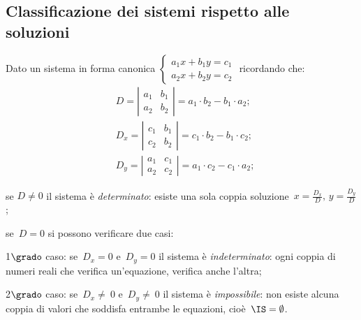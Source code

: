 \subsection{Classificazione dei sistemi rispetto alle soluzioni}
Dato un sistema in forma canonica
$\left\{\begin{array}{l}a_{1}x+b_{1}y=c_{1}\\a_{2}x+b_{2}y=c_{2} \end{array}\right. $ ricordando
che:
\begin{align*}
& D=\left|\begin{array}{cc}a_{1} & b_{1}\\ a_{2} & b_{2}\end{array}\right|=a_{1}\cdot b_{2}-b_{1}\cdot a_{2};\\
& D_{x}=\left|\begin{array}{cc}c_{1} & b_{1}\\ c_{2} & b_{2}\end{array}\right|=c_{1}\cdot b_{2}-b_{1}\cdot c_{2};\\
& D_{y}=\left|\begin{array}{cc}a_{1} & c_{1}\\ a_{2} & c_{2}\end{array}\right|=a_{1}\cdot c_{2}-c_{1}\cdot a_{2};
\end{align*}


\begin{itemize*}
\item se $D \neq 0$ il sistema è \emph{determinato}: esiste una sola coppia soluzione~$x=\frac{D_{x}}{D}\text{, }y=\frac{D_{y}}{D}$;
\item se~$D=0$ si possono verificare due casi:
 \begin{itemize*}
\item 1$\grado$ caso: se~$D_{x}=0$ e~$D_{y}=0$ il sistema è \emph{indeterminato}: ogni
coppia di numeri reali che verifica un'equazione, verifica anche l'altra;
\item 2$\grado$ caso: se~$D_{x}\neq~0$ e~$D_{y} \neq~0$ il sistema è \emph{impossibile}: non
esiste alcuna coppia di valori che soddisfa entrambe le equazioni, cioè~$\IS=\emptyset $.
 \end{itemize*}
\end{itemize*}

